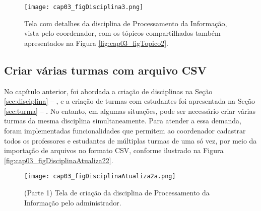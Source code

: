 \begin{figure}[!ht]
  \centering
  \texttt{[image: cap03\_figDisciplina3.png]}
  \caption{Tela com detalhes da disciplina de Processamento da Informação, vista pelo  coordenador, com os tópicos compartilhados também apresentados na Figura \ref{fig:cap03_figTopico2}.}
  \label{fig:cap03_figDisciplina3}
\end{figure}


\subsection{Criar várias turmas com arquivo CSV}\label{sec:variasTurmasCSV}

No capítulo anterior, foi abordada a criação de disciplinas na Seção \ref{sec:disciplina} -- , e a criação de turmas com estudantes foi apresentada na Seção \ref{sec:turma} -- . No entanto, em algumas situações, pode ser necessário criar várias turmas da mesma disciplina simultaneamente. Para atender a essa demanda, foram implementadas funcionalidades que permitem ao coordenador cadastrar todos os professores e estudantes de múltiplas turmas de uma só vez, por meio da importação de arquivos no formato CSV, conforme ilustrado na Figura \ref{fig:cap03_figDisciplinaAtualiza22}.



\begin{figure}[!ht]
  \centering
  \texttt{[image: cap03\_figDisciplinaAtualiza2a.png]}
  \caption{(Parte 1) Tela de criação da disciplina de Processamento da Informação pelo administrador.}
  \label{fig:cap03_figDisciplinaAtualiza2a}
\end{figure}

